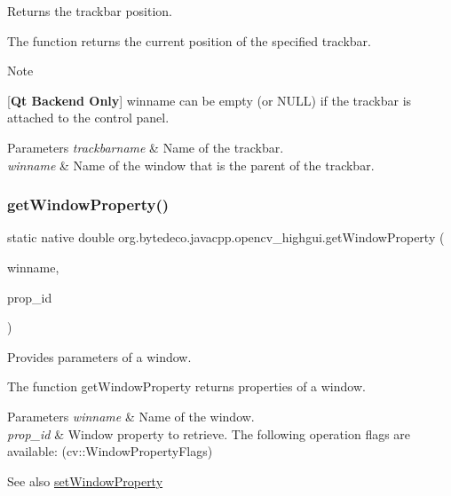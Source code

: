 Returns the trackbar position. 

The function returns the current position of the specified trackbar. 

\begin{DoxyNote}{Note}

\end{DoxyNote}
\mbox{[}{\bfseries Qt Backend Only}\mbox{]} winname can be empty (or N\+U\+LL) if the trackbar is attached to the control panel. 


\begin{DoxyParams}{Parameters}
{\em trackbarname} & Name of the trackbar. \\
\hline
{\em winname} & Name of the window that is the parent of the trackbar. \\
\hline
\end{DoxyParams}
\mbox{\label{group__highgui_gabedecb2109425cb553d605080ad980a9}} 
\subsubsection{\texorpdfstring{get\+Window\+Property()}{getWindowProperty()}}
{\footnotesize\ttfamily static native double org.\+bytedeco.\+javacpp.\+opencv\+\_\+highgui.\+get\+Window\+Property (\begin{DoxyParamCaption}\item[{@Str Byte\+Pointer}]{winname,  }\item[{int}]{prop\+\_\+id }\end{DoxyParamCaption})\hspace{0.3cm}{\ttfamily [static]}}



Provides parameters of a window. 

The function get\+Window\+Property returns properties of a window. 


\begin{DoxyParams}{Parameters}
{\em winname} & Name of the window. \\
\hline
{\em prop\+\_\+id} & Window property to retrieve. The following operation flags are available\+: (cv\+::\+Window\+Property\+Flags) \\
\hline
\end{DoxyParams}
\begin{DoxySeeAlso}{See also}
\hyperlink{group__highgui_ga0c820fdf7575d2e62d3aed900aa534cd}{set\+Window\+Property} 
\end{DoxySeeAlso}
\mbox{\label{group__highgui_gaf05d46739d8a87edb7405e79c7207975}} 
